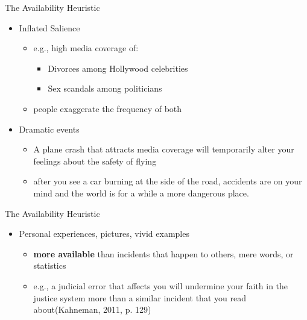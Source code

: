 \documentclass[
  ignorenonframetext,
]{beamer}
\providecommand{\tightlist}{%
  \setlength{\itemsep}{0pt}\setlength{\parskip}{0pt}}\usepackage{longtable,booktabs,array}
\begin{document}
\begin{frame}{The Availability Heuristic}
\protect\hypertarget{the-availability-heuristic-1}{}
\begin{itemize}
\tightlist
\item
  Inflated Salience

  \begin{itemize}
  \tightlist
  \item
    e.g., high media coverage of:

    \begin{itemize}
    \tightlist
    \item
      Divorces among Hollywood celebrities
    \item
      Sex scandals among politicians
    \end{itemize}
  \item
    people exaggerate the frequency of both
  \end{itemize}
\item
  Dramatic events

  \begin{itemize}
  \tightlist
  \item
    A plane crash that attracts media coverage will temporarily alter
    your feelings about the safety of flying
  \item
    after you see a car burning at the side of the road, accidents are
    on your mind and the world is for a while a more dangerous place.
  \end{itemize}
\end{itemize}
\end{frame}

\begin{frame}{The Availability Heuristic}
\protect\hypertarget{the-availability-heuristic-2}{}
\begin{itemize}
\tightlist
\item
  Personal experiences, pictures, vivid examples

  \begin{itemize}
  \tightlist
  \item
    \textbf{more available} than incidents that happen to others, mere
    words, or statistics
  \item
    e.g., a judicial error that affects you will undermine your faith in
    the justice system more than a similar incident that you read
    about(Kahneman, 2011, p. 129)
  \end{itemize}
\end{itemize}
\end{frame}
\end{document}
